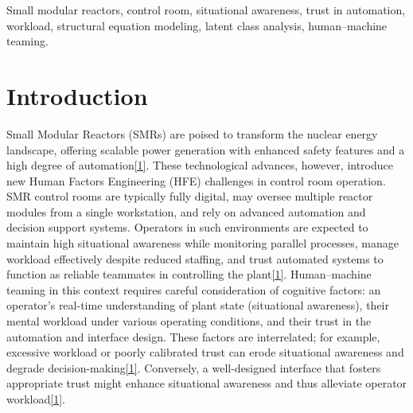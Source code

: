 \documentclass[conference]{IEEEtran}
\begin{document}
\begin{IEEEkeywords}
Small modular reactors, control room, situational awareness, trust in automation, workload, structural equation modeling, latent class analysis, human–machine teaming.
\end{IEEEkeywords}

\section{Introduction}
Small Modular Reactors (SMRs) are poised to transform the nuclear energy landscape, offering scalable power generation with enhanced safety features and a high degree of automation\href{https://www.researchgate.net/publication/337420277_Designing_for_Situation_Awareness_in_the_Main_Control_Room_of_a_Small_Modular_Reactor}{[1]}. These technological advances, however, introduce new Human Factors Engineering (HFE) challenges in control room operation. SMR control rooms are typically fully digital, may oversee multiple reactor modules from a single workstation, and rely on advanced automation and decision support systems. Operators in such environments are expected to maintain high situational awareness while monitoring parallel processes, manage workload effectively despite reduced staffing, and trust automated systems to function as reliable teammates in controlling the plant\href{https://www.researchgate.net/publication/337420277_Designing_for_Situation_Awareness_in_the_Main_Control_Room_of_a_Small_Modular_Reactor}{[1]}. Human–machine teaming in this context requires careful consideration of cognitive factors: an operator’s real-time understanding of plant state (situational awareness), their mental workload under various operating conditions, and their trust in the automation and interface design. These factors are interrelated; for example, excessive workload or poorly calibrated trust can erode situational awareness and degrade decision-making\href{https://www.researchgate.net/publication/337420277_Designing_for_Situation_Awareness_in_the_Main_Control_Room_of_a_Small_Modular_Reactor}{[1]}. Conversely, a well-designed interface that fosters appropriate trust might enhance situational awareness and thus alleviate operator workload\href{https://www.researchgate.net/publication/337420277_Designing_for_Situation_Awareness_in_the_Main_Control_Room_of_a_Small_Modular_Reactor}{[1]}.
\end{document}
